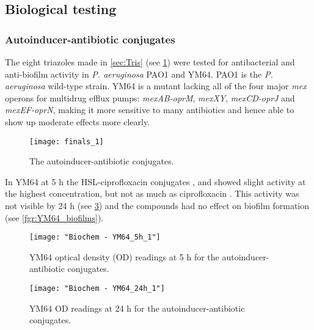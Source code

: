 \subsection{Biological testing\label{sec:bio1}}

\subsubsection{Autoinducer-antibiotic conjugates}

The eight triazoles made in \ref{sec:Tris} (see \ref{fgr:finals_1}) were tested for antibacterial and anti-biofilm activity in \textit{P. aeruginosa} PAO1\cite{Stover2000} and YM64\cite{Morita2001}.
PAO1 is the \textit{P. aeruginosa} wild-type strain.
YM64 is a mutant lacking all of the four major \textit{mex} operons for multidrug efflux pumps: \textit{mexAB-oprM}, \textit{mexXY}, \textit{mexCD-oprJ} and \textit{mexEF-oprN}, making it more sensitive to many antibiotics and hence able to show up moderate effects more clearly.

\begin{figure}[H]
	\begin{center}
		\texttt{[image: finals\_1]}
		\caption{The autoinducer-antibiotic conjugates.
 		\label{fgr:finals_1}}
	\end{center}
\end{figure}


In YM64 at 5 h the HSL-ciprofloxacin conjugates ,  and  showed slight activity at the highest concentration, but not as much as ciprofloxacin .
This activity was not visible by 24 h (see \ref{fgr:YM64_24h}) and the compounds had no effect on biofilm formation (see \ref{fgr:YM64_biofilms}).



\begin{figure}[H]
	\begin{center}
		\texttt{[image: "Biochem - YM64\_5h\_1"]}
		\caption{YM64 optical density (OD) readings at 5 h for the autoinducer-antibiotic conjugates.\label{fgr:YM64_5h}}
	\end{center}
\end{figure}
\begin{figure}[H]
	\begin{center}
		\texttt{[image: "Biochem - YM64\_24h\_1"]}
		\caption{YM64 OD readings at 24 h for the autoinducer-antibiotic conjugates.\label{fgr:YM64_24h}}
	\end{center}
\end{figure}

